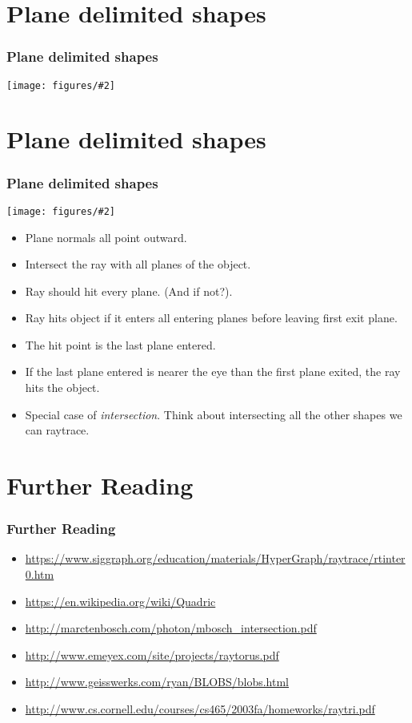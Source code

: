 \documentclass[slidestop,xcolor=pst]{beamer}
\newcommand{\mygraph}[2]{\texttt{[image: figures/\#2]}}
\newcommand{\mygraphc}[2]{\centerline{\texttt{[image: figures/\#2]}}}
\newcommand{\sect}[1]{
\section{#1}
\begin{frame}[fragile]\frametitle{#1}
}
\newcommand{\bi}{\begin{itemize}}
\newcommand{\ei}{\end{itemize}}
\begin{document}
\sect{Plane delimited shapes}
\mygraphc{0.6}{planedelimited.png}
\end{frame}

\sect{Plane delimited shapes}
\mygraph{0.3}{planedelimited.png}
\begin{minipage}{3in}
  \bi
\item Plane normals all point outward.
\item Intersect the ray with all planes of the object.
\item Ray should hit every plane.  (And if not?).
  \item Ray hits object if it enters all entering planes before
    leaving first exit plane.
\item The hit point is the last plane entered.
\item If the last plane entered is nearer the eye than the first plane
  exited, the ray hits the object. 
\item Special case of {\em intersection}.  Think about intersecting
  all the other shapes we can raytrace.
 \ei
\end{minipage}
\end{frame}



\sect{Further Reading}
\begin{itemize}
\item
\url{https://www.siggraph.org/education/materials/HyperGraph/raytrace/rtinter0.htm}
\item \url{https://en.wikipedia.org/wiki/Quadric}
\item \url{http://marctenbosch.com/photon/mbosch_intersection.pdf}
\item\url{http://www.emeyex.com/site/projects/raytorus.pdf}
\item
\url{http://www.geisswerks.com/ryan/BLOBS/blobs.html}
\item 
 \url{http://www.cs.cornell.edu/courses/cs465/2003fa/homeworks/raytri.pdf}
\end{itemize}
\end{frame}
\end{document}
